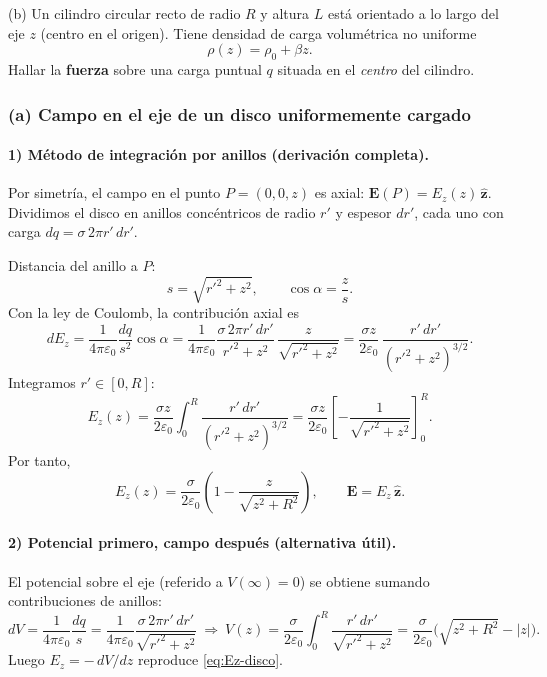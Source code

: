 \documentclass{article}
\begin{document}
(b) Un cilindro circular recto de radio $R$ y altura $L$ está orientado a lo largo del eje $z$ (centro en el origen). Tiene densidad de carga volumétrica no uniforme
\[
\rho(z)=\rho_0+\beta z.
\]
Hallar la \textbf{fuerza} sobre una carga puntual $q$ situada en el \emph{centro} del cilindro.

\subsubsection*{(a) Campo en el eje de un disco uniformemente cargado}

\paragraph{1) Método de integración por anillos (derivación completa).}
Por simetría, el campo en el punto $P=(0,0,z)$ es axial: $\mathbf E(P)=E_z(z)\,\hat{\mathbf z}$.  
Dividimos el disco en anillos concéntricos de radio $r'$ y espesor $dr'$, cada uno con carga $dq=\sigma\,2\pi r'\,dr'$.

Distancia del anillo a $P$:
\[
s=\sqrt{r'^2+z^2},\qquad \cos\alpha=\frac{z}{s}.
\]
Con la ley de Coulomb, la contribución axial es
\[
dE_z=\frac{1}{4\pi\varepsilon_0}\frac{dq}{s^2}\cos\alpha
= \frac{1}{4\pi\varepsilon_0}\frac{\sigma\,2\pi r'\,dr'}{r'^2+z^2}\,\frac{z}{\sqrt{r'^2+z^2}}
= \frac{\sigma z}{2\varepsilon_0}\,\frac{r'\,dr'}{(r'^2+z^2)^{3/2}}.
\]
Integramos $r'\in[0,R]$:
\[
E_z(z)=\frac{\sigma z}{2\varepsilon_0}\int_0^{R}\frac{r'\,dr'}{(r'^2+z^2)^{3/2}}
= \frac{\sigma z}{2\varepsilon_0}\left[-\frac{1}{\sqrt{r'^2+z^2}}\right]_{0}^{R}.
\]
Por tanto,
\begin{equation}\label{eq:Ez-disco}
\boxed{\,E_z(z)=\frac{\sigma}{2\varepsilon_0}\left(1-\frac{z}{\sqrt{z^2+R^2}}\right),\qquad \mathbf E=E_z\,\hat{\mathbf z}. \,}
\end{equation}

\paragraph{2) Potencial primero, campo después (alternativa útil).}
El potencial sobre el eje (referido a $V(\infty)=0$) se obtiene sumando contribuciones de anillos:
\[
dV=\frac{1}{4\pi\varepsilon_0}\frac{dq}{s}
=\frac{1}{4\pi\varepsilon_0}\frac{\sigma\,2\pi r'\,dr'}{\sqrt{r'^2+z^2}}
\ \Rightarrow\
V(z)=\frac{\sigma}{2\varepsilon_0}\!\int_0^R\!\frac{r'\,dr'}{\sqrt{r'^2+z^2}}
=\frac{\sigma}{2\varepsilon_0}\big(\sqrt{z^2+R^2}-|z|\big).
\]
Luego $E_z=-\,dV/dz$ reproduce \eqref{eq:Ez-disco}.  
\end{document}
